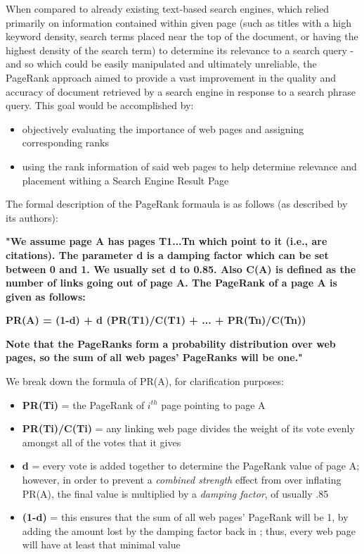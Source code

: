 \documentclass[pdftex,12pt,a4paper]{article}
\begin{document}
When compared to already existing text-based search engines, which relied primarily on information contained within given page (such as titles with a high keyword density, search terms placed near the top of the document, or having the highest density of the search term) to determine its relevance to a search query - and so which could be easily manipulated and ultimately unreliable, the PageRank approach aimed to provide a vast improvement in the quality and accuracy of document retrieved by a search engine in response to a search  phrase query. This goal would be accomplished by:

\begin{itemize}
\item objectively evaluating the importance of web pages and assigning corresponding ranks
\item using the rank information of said web pages to help determine relevance and placement withing a Search Engine Result Page
\end{itemize}

The formal description of the PageRank formaula is as follows (as described by its authors):

\vspace{10pt}


\textbf{"We assume page A has pages T1...Tn which point to it (i.e., are citations).
The parameter d is a damping factor which can be set between 0 and 1. We
usually set d to 0.85.
Also C(A) is defined as the number of links going out of page A. The
PageRank of a page A is given as follows:}

\vspace{10pt}

\begin{centering}
\textbf{PR(A) = (1-d) + d (PR(T1)/C(T1) + ... + PR(Tn)/C(Tn))}
\end{centering}
\vspace{10pt}

\textbf{Note that the PageRanks form a probability distribution over web pages, so the sum of all web pages' PageRanks will be one."}

\vspace{10pt}

We break down the formula of PR(A), for clarification purposes:

\begin{itemize}
\item \textbf{PR(Ti)} = the PageRank of $i^{th}$ page pointing to page A
\item \textbf{PR(Ti)/C(Ti)} = any linking web page divides the weight of its vote evenly amongst all of the votes that it gives
\item \textbf{d} = every vote is added together to determine the PageRank value of page A; however, in order to prevent a \emph{combined strength} effect from over inflating PR(A), the final value is multiplied by a \emph{damping factor}, of usually .85
\item \textbf{(1-d)} = this ensures that the sum of all web pages' PageRank will be 1, by adding the amount lost by the damping factor back in ; thus, every web page will have at least that minimal value
\end{itemize}
\end{document}
